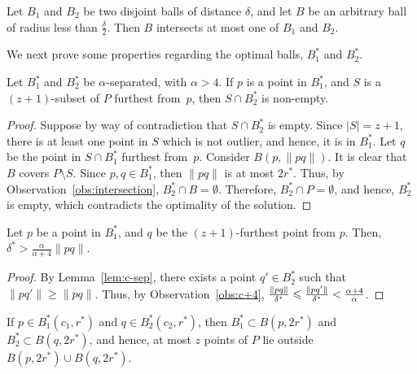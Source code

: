 \documentclass[envcountsame]{cls/cccg15}
\newcommand{\card}[1]{\left|{#1}\right|}
\newcommand{\len}[1]{\|{#1}\|}
\newcommand{\lee}{\leqslant}
\newcommand{\gee}{\geqslant}
\renewcommand{\le}{\lee}
\renewcommand{\ge}{\gee}
\begin{document}
\begin{obs}
\label{obs:intersection}
	Let $B_1$ and $B_2$ be two disjoint balls of distance $\delta$,
	and let $B$ be an arbitrary ball of radius less than $\frac{\delta}{2}$. 
	Then $B$ intersects at most one of $B_1$ and $B_2$.
\end{obs}

\noindent 
We next prove some properties regarding 
the optimal balls, $B_1^*$ and $B_2^*$.

\begin{lemma}
\label{lem:c-sep}
	Let $B_1^*$ and $B_2^*$ be $\alpha$-separated, with $\alpha > 4$.
	If $p$ is a point in $B_1^*$,
	and $S$ is a $(z+1)$-subset of $P$ furthest from~$p$,
	then $S \cap B_2^*$ is non-empty.
\end{lemma}

\begin{proof}
Suppose by way of contradiction that $S \cap B_2^*$ is empty. 
Since $\card{S} = z + 1$, there is at least one point in $S$
which is not outlier, and hence, it is in $B_1^*$.
Let $q$ be the point in $S \cap B_1^*$ furthest from~$p$. 
Consider $B(p, \len{pq})$. It is clear that $B$ covers $P \setminus S$. 
Since $p, q \in B_1^*$, then $\len{pq}$ is at most $2r^*$. 
Thus, by Observation~\ref{obs:intersection}, $B_2^* \cap B = \emptyset$. 
Therefore, $B_2^* \cap P = \emptyset$, and hence,
 $B_2^*$ is empty, which contradicts the optimality of the solution.
\end{proof}

\begin{lemma}
\label{lem:(z+1)-furthest}
	Let $p$ be a point in $B_1^{*}$,
	and $q$ be the $(z+1)$-furthest point from $p$. 
	Then, $\delta^* > \frac{\alpha}{\alpha+4}\len{pq}$.
\end{lemma}

\begin{proof}
By Lemma~\ref{lem:c-sep}, there exists a point $q' \in B_2^*$ 
such that $\len{pq'} \ge \len{pq}$. 
Thus, by Observation~\ref{obs:c+4}, 
${\len{pq} \over \delta^*} \le {\len{pq'} \over \delta^*} < \frac{\alpha+4}{\alpha}$.
\end{proof}

\begin{lemma}
\label{lem:2r}
	If $p \in B_1^*(c_1, r^*)$ and $q \in B_2^*(c_2, r^*)$,
	then $B_1^* \subset B(p, 2r^*)$ and $B_2^* \subset B(q, 2r^*)$,
	and hence, at most $z$ points of $P$ lie outside $B(p, 2r^*) \cup B(q, 2r^*)$.
\end{lemma}
\end{document}

